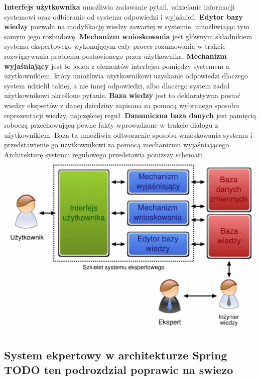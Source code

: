 \textbf{Interfejs użytkownika} umożliwia zadawanie pytań, udzielanie informacji systemowi oraz odbieranie od systemu odpowiedzi i wyjaśnień.
\textbf{Edytor bazy wiedzy} pozwala na modyfikację wiedzy zawartej w systemie, umożliwiając tym samym jego rozbudowę.
\textbf{Mechanizm wnioskowania} jest głównym składnikiem systemu ekspertowego wykonującym cały proces rozumowania w trakcie rozwiązywania problemu postawionego przez użytkownika.
\textbf{Mechanizm wyjaśniający} jest to jeden z elementów interfejsu pomiędzy systemem a użytkownikiem, który umożliwia użytkownikowi uzyskanie odpowiedzi dlaczego system udzielił takiej, a nie innej odpowiedzi, albo dlaczego system zadał użytkownikowi określone pytanie.
\textbf{Baza wiedzy} jest to deklaratywna postać wiedzy ekspertów z danej dziedziny zapisana za pomocą wybranego sposobu reprezentacji wiedzy, najczęściej reguł.
\textbf{Danamiczna baza danych} jest pamięcią roboczą przechowującą pewne fakty wprowadzone w trakcie dialogu z użytkownikiem. Baza ta umożliwia odtworzenie sposobu wnioskowania systemu i przedstawienie go użytkownikowi za pomocą mechanizmu wyjaśniającego.
Architekturę systemu regułowego przedstawia poniższy schemat:
\includegraphics[scale=0.5]{images/expert-system}

\subsection{System ekpertowy w architekturze Spring TODO ten podrozdzial poprawic na swiezo}
\label{sec:systemEkpertowyArchitekturaSpring}


